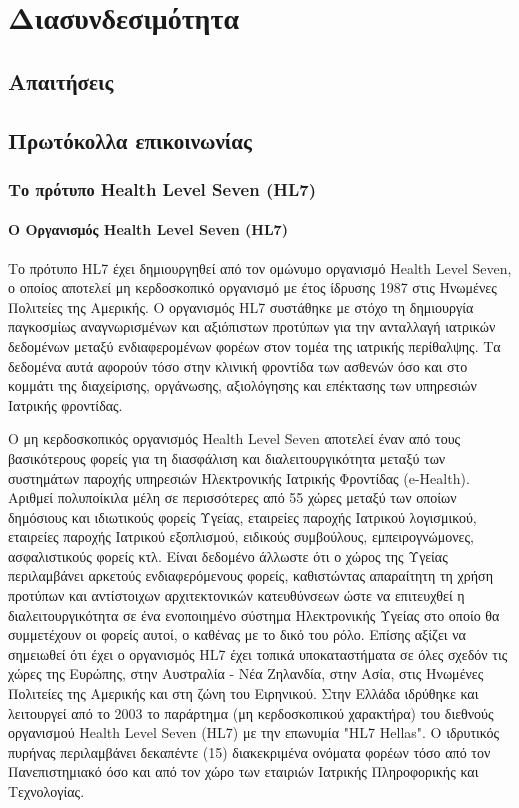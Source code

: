 \graphicspath{ {Figures/interoperability/} }
\chapter{Διασυνδεσιμότητα}\label{ch:Interoperability}
\section{Απαιτήσεις}

\section{Πρωτόκολλα επικοινωνίας}


	\subsection{Το πρότυπο Health Level Seven (HL7)}
		\subsubsection{Ο Οργανισμός Health Level Seven (HL7)}
		Το πρότυπο HL7 έχει δημιουργηθεί από τον ομώνυμο οργανισμό Health Level Seven, ο οποίος αποτελεί μη κερδοσκοπικό οργανισμό με έτος ίδρυσης 1987 στις Ηνωμένες Πολιτείες της Αμερικής\cite{HL7Organization}\cite{blobel2003hl7}. Ο οργανισμός HL7 συστάθηκε με στόχο τη δημιουργία παγκοσμίως αναγνωρισμένων και αξιόπιστων προτύπων για την ανταλλαγή ιατρικών δεδομένων μεταξύ ενδιαφερομένων φορέων στον τομέα της ιατρικής περίθαλψης. Τα δεδομένα αυτά αφορούν τόσο στην κλινική φροντίδα των ασθενών όσο και στο κομμάτι της διαχείρισης, οργάνωσης, αξιολόγησης και επέκτασης των υπηρεσιών Ιατρικής φροντίδας.

Ο μη κερδοσκοπικός οργανισμός Health Level Seven αποτελεί έναν από τους βασικότερους φορείς για τη διασφάλιση και διαλειτουργικότητα μεταξύ των συστημάτων παροχής υπηρεσιών Ηλεκτρονικής Ιατρικής Φροντίδας (e-Health). Αριθμεί πολυποίκιλα μέλη σε περισσότερες από 55 χώρες μεταξύ των οποίων δημόσιους και ιδιωτικούς φορείς Υγείας, εταιρείες παροχής Ιατρικού λογισμικού, εταιρείες παροχής Ιατρικού εξοπλισμού, ειδικούς συμβούλους, εμπειρογνώμονες, ασφαλιστικούς φορείς κτλ\cite{HL7Organization}. Είναι δεδομένο άλλωστε ότι ο χώρος της Υγείας περιλαμβάνει αρκετούς ενδιαφερόμενους φορείς, καθιστώντας απαραίτητη τη χρήση προτύπων και αντίστοιχων αρχιτεκτονικών κατευθύνσεων ώστε να επιτευχθεί η διαλειτουργικότητα σε ένα ενοποιημένο σύστημα Ηλεκτρονικής Υγείας στο οποίο θα συμμετέχουν οι φορείς αυτοί, ο καθένας με το δικό του ρόλο. Επίσης αξίζει να σημειωθεί ότι έχει ο οργανισμός HL7 έχει τοπικά υποκαταστήματα σε όλες σχεδόν τις χώρες της Ευρώπης, στην Αυστραλία - Νέα Ζηλανδία, στην Ασία, στις Ηνωμένες Πολιτείες της Αμερικής και στη ζώνη του Ειρηνικού. Στην Ελλάδα ιδρύθηκε και λειτουργεί από το 2003 το παράρτημα (μη κερδοσκοπικού χαρακτήρα) του διεθνούς οργανισμού Health Level Seven (HL7) με την επωνυμία "HL7 Hellas". Ο ιδρυτικός πυρήνας περιλαμβάνει δεκαπέντε (15) διακεκριμένα ονόματα φορέων τόσο από τον Πανεπιστημιακό όσο και από τον χώρο των εταιριών Ιατρικής Πληροφορικής και Τεχνολογίας\cite{HL7Hellas}.


